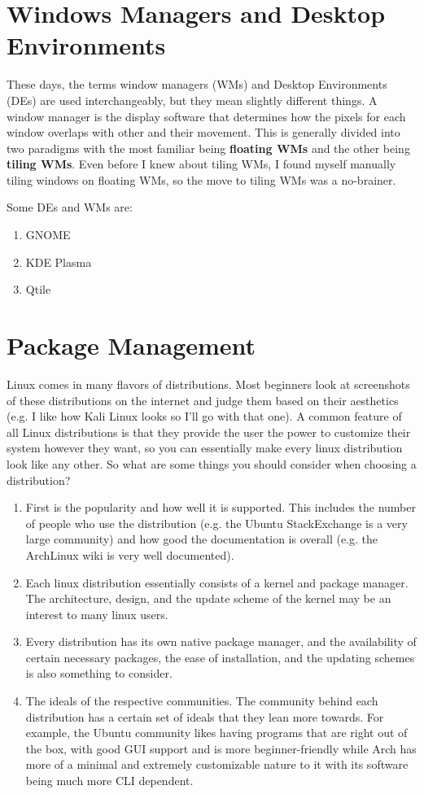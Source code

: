 \documentclass{article}
\theoremstyle{definition}
\begin{document}
\section{Windows Managers and Desktop Environments}

  These days, the terms window managers (WMs) and Desktop Environments (DEs) are used interchangeably, but they mean slightly different things. A window manager is the display software that determines how the pixels for each window overlaps with other and their movement. This is generally divided into two paradigms with the most familiar being \textbf{floating WMs} and the other being \textbf{tiling WMs}. Even before I knew about tiling WMs, I found myself manually tiling windows on floating WMs, so the move to tiling WMs was a no-brainer. 
  
  Some DEs and WMs are: 
  \begin{enumerate}
    \item GNOME 
    \item KDE Plasma
    \item Qtile
  \end{enumerate}

\section{Package Management}
  
  Linux comes in many flavors of distributions. Most beginners look at screenshots of these distributions on the internet and judge them based on their aesthetics (e.g. I like how Kali Linux looks so I'll go with that one). A common feature of all Linux distributions is that they provide the user the power to customize their system however they want, so you can essentially make every linux distribution look like any other. So what are some things you should consider when choosing a distribution? 

  \begin{enumerate}
    \item First is the popularity and how well it is supported. This includes the number of people who use the distribution (e.g. the Ubuntu StackExchange is a very large community) and how good the documentation is overall (e.g. the ArchLinux wiki is very well documented). 
    \item Each linux distribution essentially consists of a kernel and package manager. The architecture, design, and the update scheme of the kernel may be an interest to many linux users.  
    \item Every distribution has its own native package manager, and the availability of certain necessary packages, the ease of installation, and the updating schemes is also something to consider.  
    \item The ideals of the respective communities. The community behind each distribution has a certain set of ideals that they lean more towards. For example, the Ubuntu community likes having programs that are right out of the box, with good GUI support and is more beginner-friendly while Arch has more of a minimal and extremely customizable nature to it with its software being much more CLI dependent. 
  \end{enumerate}
\end{document}
